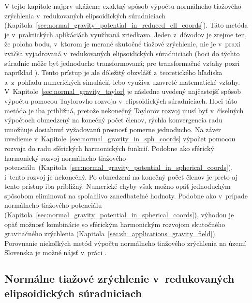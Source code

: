 \documentclass[a4paper, 12pt]{book}
\begin{document}
V tejto kapitole najprv ukážeme exaktný spôsob výpočtu normálneho tiažového 
zrýchlenia v~redukovaných elipsoidických súradniciach 
(Kapitola~\ref{sec:normal_gravity_potential_in_reduced_ell_coords}).  Táto 
metóda je v~praktických aplikáciách využívaná zriedkavo.  Jeden z~dôvodov je 
zrejme ten, že poloha bodu, v~ktorom je merané skutočné tiažové zrýchlenie, nie 
je v~praxi zväčša vyjadrovaná v~redukovaných elipsoidických súradniciach (hoci 
do týchto súradníc môže byť jednoducho transformovaná; pre transformačné vzťahy 
pozri napríklad \cite{MoritzPhysicalGeodesy}).  Tento prístup je ale dôležitý 
obzvlášť z~teoretického hľadiska a~z~pohľadu numerických simulácií, lebo 
využíva uzavreté matematické vzťahy.  
V~Kapitole~\ref{sec:normal_gravity_taylor} je následne uvedený najčastejší 
spôsob výpočtu pomocou Taylorovho rozvoja v~elipsoidických súradniciach.  Hoci 
táto metóda je iba približná, pretože nekonečný Taylorov rozvoj musí byť 
v~číselných výpočtoch obmedzený na konečný počet členov, rýchla konvergencia 
radu umožňuje dosiahnuť vyžadovanú presnosť pomerne jednoducho.  Na záver 
uvedieme v~Kapitole~\ref{sec:normal_gravity_in_sph_coords} výpočet pomocou 
rozvoja do radu sférických harmonických funkcií.  Podobne ako sférický 
harmonický rozvoj normálneho tiažového 
potenciálu~(Kapitola~\ref{sec:normal_gravity_potential_in_spherical_coords}), 
i~tento rozvoj je nekonečný.  Po obmedzení na konečný počet členov je preto aj
tento prístup iba približný.  Numerické chyby však možno opäť jednoduchým 
spôsobom eliminovať na spoľahlivo zanedbateľné hodnoty.  Podobne ako v~prípade 
normálneho tiažového potenciálu 
(Kapitola~\ref{sec:normal_gravity_potential_in_spherical_coords}), výhodou je 
opäť možnosť kombinácie so sférickým harmonickým rozvojom skutočného 
gravitačného zrýchlenia (Kapitola~\ref{sec:sh_applications_gravity_field}).  
Porovnanie niekoľkých metód výpočtu normálneho tiažového zrýchlenia na území 
Slovenska je možné nájsť v~práci \textcite{Vajda2005}.



\subsection{Normálne tiažové zrýchlenie v~redukovaných elipsoidických 
súradniciach}
\label{sec:normal_gravity_in_reduced_ell_coords}
\end{document}
